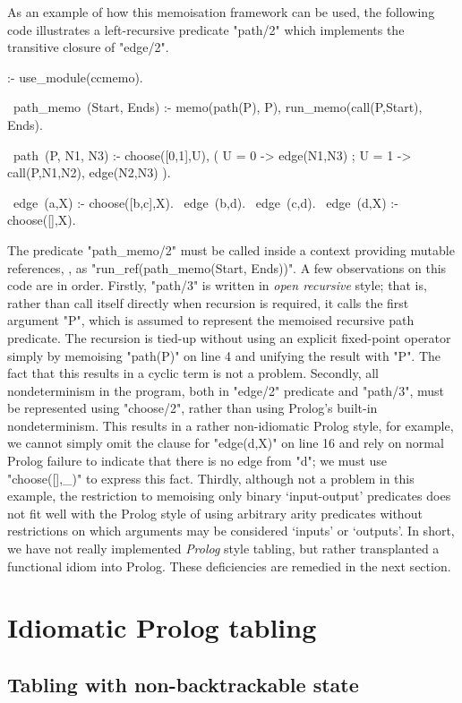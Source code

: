 As an example of how this memoisation framework can be used, the following code illustrates a left-recursive
predicate "path/2" which implements the transitive closure of "edge/2".
\begin{prolog-framed}[numbers=left]
  :- use_module(ccmemo).

  ~path_memo~(Start, Ends) :-
    memo(path(P), P),
    run_memo(call(P,Start), Ends).

  ~path~(P, N1, N3) :- 
    choose([0,1],U), 
    ( U = 0 -> edge(N1,N3)
    ; U = 1 -> call(P,N1,N2), edge(N2,N3)
    ).

  ~edge~(a,X) :- choose([b,c],X).
  ~edge~(b,d).
  ~edge~(c,d).
  ~edge~(d,X) :- choose([],X).
\end{prolog-framed}
The predicate "path_memo/2" must be called inside a context providing mutable references, \eg, as
"run_ref(path_memo(Start, Ends))".
A few observations on this code are in order. Firstly, "path/3" is written in \emph{open recursive} style;
that is, rather than call itself directly when recursion is required, it calls the first argument "P", which
is assumed to represent the memoised recursive path predicate. The recursion is tied-up without using
an explicit fixed-point operator simply by memoising "path(P)" on line 4 and unifying the result with "P".
The fact that this results in a cyclic term is not a problem. Secondly, all nondeterminism in the
program, both in "edge/2" predicate and "path/3", must be represented using "choose/2",
rather than using Prolog's built-in nondeterminism. This results in a rather non-idiomatic Prolog style, for
example, we cannot simply omit the clause for "edge(d,X)" on line 16 and rely on normal Prolog failure to indicate that there is no edge 
from "d"; we must use "choose([],_)" to express this fact. Thirdly, although not a problem in this example,
the restriction to memoising only binary `input-output' predicates does not fit well with the Prolog style
of using arbitrary arity predicates without restrictions on which arguments may be considered
`inputs' or `outputs'. In short, we have not really implemented \emph{Prolog} style tabling, but rather
transplanted a functional idiom into Prolog. These deficiencies are remedied in the next section.


\section{Idiomatic Prolog tabling}
\label{sec:idiomatic}

\subsection{Tabling with non-backtrackable state}
\label{sec:ccnbstate}

